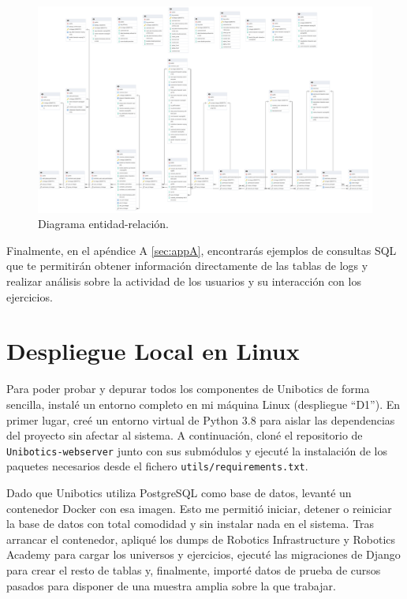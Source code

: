 \documentclass[a4paper, 12pt]{book}
\begin{document}
\begin{landscape}
    \begin{figure}[H]
        \centering
        \includegraphics[height=0.9\textheight, keepaspectratio]{img/ER.png}
        \caption{Diagrama entidad-relación.}
        \label{fig:ER}
    \end{figure}
\end{landscape}
    


Finalmente, en el apéndice A \ref{sec:appA}, encontrarás ejemplos de consultas SQL que te permitirán obtener información directamente de las tablas de logs y realizar análisis sobre la actividad de los usuarios y su interacción con los ejercicios.

\section{Despliegue Local en Linux}

Para poder probar y depurar todos los componentes de Unibotics de forma sencilla, instalé un entorno completo en mi máquina Linux (despliegue “D1”). En primer lugar, creé un entorno virtual de Python 3.8 para aislar las dependencias del proyecto sin afectar al sistema. A continuación, cloné el repositorio de \texttt{Unibotics-webserver} junto con sus submódulos y ejecuté la instalación de los paquetes necesarios desde el fichero \texttt{utils/requirements.txt}.  

Dado que Unibotics utiliza PostgreSQL como base de datos, levanté un contenedor Docker con esa imagen. Esto me permitió iniciar, detener o reiniciar la base de datos con total comodidad y sin instalar nada en el sistema. Tras arrancar el contenedor, apliqué los dumps de Robotics Infrastructure y Robotics Academy para cargar los universos y ejercicios, ejecuté las migraciones de Django para crear el resto de tablas y, finalmente, importé datos de prueba de cursos pasados para disponer de una muestra amplia sobre la que trabajar.
\end{document}
